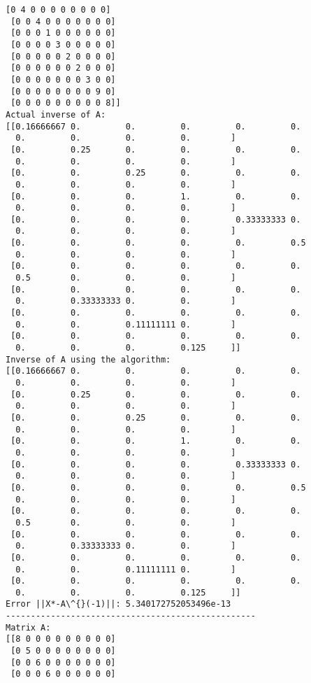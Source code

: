 \documentclass[11pt]{article}
\begin{document}
\begin{Verbatim}[commandchars=\\\{\}]
 [0 4 0 0 0 0 0 0 0 0]
 [0 0 4 0 0 0 0 0 0 0]
 [0 0 0 1 0 0 0 0 0 0]
 [0 0 0 0 3 0 0 0 0 0]
 [0 0 0 0 0 2 0 0 0 0]
 [0 0 0 0 0 0 2 0 0 0]
 [0 0 0 0 0 0 0 3 0 0]
 [0 0 0 0 0 0 0 0 9 0]
 [0 0 0 0 0 0 0 0 0 8]]
Actual inverse of A:
[[0.16666667 0.         0.         0.         0.         0.
  0.         0.         0.         0.        ]
 [0.         0.25       0.         0.         0.         0.
  0.         0.         0.         0.        ]
 [0.         0.         0.25       0.         0.         0.
  0.         0.         0.         0.        ]
 [0.         0.         0.         1.         0.         0.
  0.         0.         0.         0.        ]
 [0.         0.         0.         0.         0.33333333 0.
  0.         0.         0.         0.        ]
 [0.         0.         0.         0.         0.         0.5
  0.         0.         0.         0.        ]
 [0.         0.         0.         0.         0.         0.
  0.5        0.         0.         0.        ]
 [0.         0.         0.         0.         0.         0.
  0.         0.33333333 0.         0.        ]
 [0.         0.         0.         0.         0.         0.
  0.         0.         0.11111111 0.        ]
 [0.         0.         0.         0.         0.         0.
  0.         0.         0.         0.125     ]]
Inverse of A using the algorithm:
[[0.16666667 0.         0.         0.         0.         0.
  0.         0.         0.         0.        ]
 [0.         0.25       0.         0.         0.         0.
  0.         0.         0.         0.        ]
 [0.         0.         0.25       0.         0.         0.
  0.         0.         0.         0.        ]
 [0.         0.         0.         1.         0.         0.
  0.         0.         0.         0.        ]
 [0.         0.         0.         0.         0.33333333 0.
  0.         0.         0.         0.        ]
 [0.         0.         0.         0.         0.         0.5
  0.         0.         0.         0.        ]
 [0.         0.         0.         0.         0.         0.
  0.5        0.         0.         0.        ]
 [0.         0.         0.         0.         0.         0.
  0.         0.33333333 0.         0.        ]
 [0.         0.         0.         0.         0.         0.
  0.         0.         0.11111111 0.        ]
 [0.         0.         0.         0.         0.         0.
  0.         0.         0.         0.125     ]]
Error ||X*-A\^{}(-1)||: 5.340172752053496e-13
--------------------------------------------------
Matrix A:
[[8 0 0 0 0 0 0 0 0 0]
 [0 5 0 0 0 0 0 0 0 0]
 [0 0 6 0 0 0 0 0 0 0]
 [0 0 0 6 0 0 0 0 0 0]

\end{Verbatim}
\end{document}
